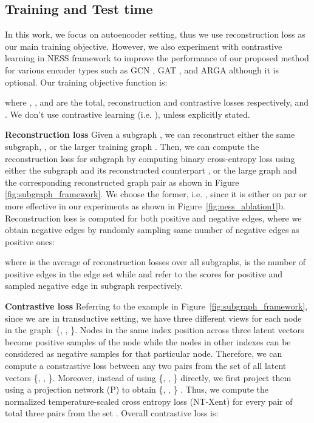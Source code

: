 \documentclass{article}
\begin{document}
\subsection{Training and Test time}
In this work, we focus on autoencoder setting, thus we use reconstruction loss as our main training objective. However, we also experiment with contrastive learning in NESS framework to improve the performance of our proposed method for various encoder types such as GCN \citep{kipf2016semi}, GAT \citep{velivckovic2017graph}, and ARGA \citep{pan2018adversarially} although it is optional. Our training objective function is:

where , , and  are the total, reconstruction and contrastive losses respectively, and . We don't use contrastive learning (i.e. ), unless explicitly stated.

\textbf{Reconstruction loss} Given a subgraph , we can reconstruct either the same subgraph, , or the larger training graph . 
Then, we can compute the reconstruction loss for  subgraph by computing binary cross-entropy loss using either the subgraph and its reconstructed counterpart , or the large graph and the corresponding reconstructed graph  pair as shown in Figure \ref{fig:subgraph_framework}. We choose the former, i.e. , since it is either on par or more effective in our experiments as shown in Figure~\ref{fig:ness_ablation1}b. Reconstruction loss is computed for both positive and negative edges, where we obtain negative edges by randomly sampling same number of negative edges as positive ones: 

where  is the average of reconstruction losses  over all  subgraphs,  is the number of positive edges in the edge set  while  and  refer to the scores for  positive and sampled negative edge in  subgraph respectively.



\textbf{Contrastive loss}
Referring to the example in Figure~\ref{fig:subgraph_framework}, since we are in transductive setting, we have three different views for each node in the graph: \{, , \}. Nodes in the same index position across three latent vectors become positive samples of the node while the nodes in other indexes can be considered as negative samples for that particular node. Therefore, we can compute a constrastive loss between any two pairs from the set of all latent vectors \{, , \}. Moreover, instead of using \{, , \} directly, we first project them using a projection network (P) to obtain \{, , \} \citep{chen2020simple}. Thus, we compute the normalized temperature-scaled cross entropy loss (NT-Xent) \citep{chen2020simple} for every pair  of total three pairs from the set . Overall contrastive loss is: 
 
\end{document}

